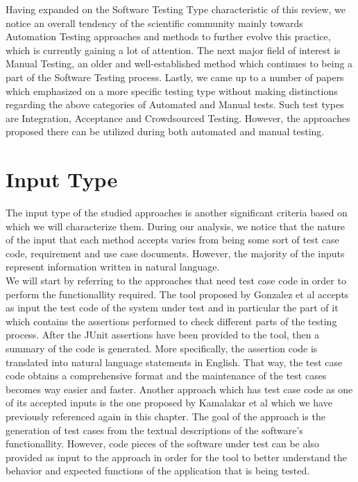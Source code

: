 Having expanded on the Software Testing Type characteristic of this review, we notice an overall tendency of the scientific community mainly towards Automation Testing approaches and methods to further 
evolve this practice, which is currently gaining a lot of attention. The next major field of interest is Manual Testing, an older and well-established method which continues to being a part of the Software 
Testing process. Lastly, we came up to a number of papers which emphasized on a more specific testing type without making distinctions regarding the above categories of Automated and Manual tests. Such test 
types are Integration, Acceptance and Crowdsourced Testing. However, the approaches proposed there can be utilized during both automated and manual testing.

\section{Input Type}
The input type of the studied approaches is another significant criteria based on which we will characterize them. During our analysis, we notice 
that the nature of the input that each method accepts varies from being some sort of test case code, requirement and use case documents. However, the 
majority of the inputs represent information written in natural language.\\

We will start by referring to the approaches that need test case code in order to perform the functionallity required. The tool proposed by Gonzalez et al \cite{10.1145/3283812.3283819} accepts 
as input the test code of the system under test and in particular the part of it which contains the assertions performed to check different parts of the testing 
process. After the JUnit assertions have been provided to the tool, then a summary of the code is generated. More specifically, the assertion code 
is translated into natural language statements in English. That way, the test case code obtains a comprehensive format and the maintenance 
of the test cases becomes way easier and faster. Another approach which has test case code as one of its accepted inputs is the one proposed by 
Kamalakar et al \cite{kamalakar2013automatically} which we have previously referenced again in this chapter. The goal of the approach is the generation 
of test cases from the textual descriptions of the software's functionallity. However, code pieces of the software under test can be also provided as input 
to the approach in order for the tool to better understand the behavior and expected functions of the application that is being tested.\\

